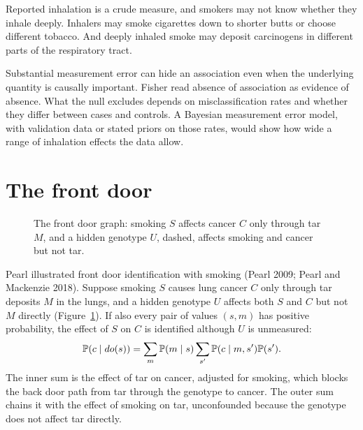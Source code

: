Reported inhalation is a crude measure, and smokers may not know whether they inhale deeply. Inhalers may smoke cigarettes down to shorter butts or choose different tobacco. And deeply inhaled smoke may deposit carcinogens in different parts of the respiratory tract.

Substantial measurement error can hide an association even when the underlying quantity is causally important. Fisher read absence of association as evidence of absence. What the null excludes depends on misclassification rates and whether they differ between cases and controls. A Bayesian measurement error model, with validation data or stated priors on those rates, would show how wide a range of inhalation effects the data allow.

\section{The front door}
\begin{figure}[ht]
\centering
{}
\caption{The front door graph: smoking $S$ affects cancer $C$ only through tar $M$, and a hidden genotype $U$, dashed, affects smoking and cancer but not tar.}
\label{fig:dagfd}
\end{figure}


Pearl illustrated front door identification with smoking (Pearl 2009; Pearl and Mackenzie 2018). Suppose smoking $S$ causes lung cancer $C$ only through tar deposits $M$ in the lungs, and a hidden genotype $U$ affects both $S$ and $C$ but not $M$ directly (Figure~\ref{fig:dagfd}). If also every pair of values $(s, m)$ has positive probability, the effect of $S$ on $C$ is identified although $U$ is unmeasured:
\begin{equation}
\mathbb{P}(c \mid do(s)) = \sum_m \mathbb{P}(m \mid s) \sum_{s'} \mathbb{P}(c \mid m, s')\mathbb{P}(s').
\label{eq:frontdoor}
\end{equation}
The inner sum is the effect of tar on cancer, adjusted for smoking, which blocks the back door path from tar through the genotype to cancer. The outer sum chains it with the effect of smoking on tar, unconfounded because the genotype does not affect tar directly.

